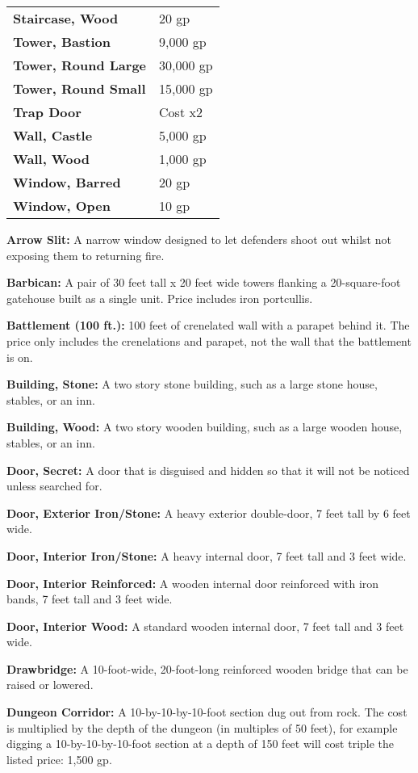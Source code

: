 \begin{multicols*}{2}
\begin {table}[H]
\begin{tabularx}{\columnwidth}{>{\bfseries}YY}
	Staircase, Wood & 20 gp\\
	Tower, Bastion & 9,000 gp\\
	Tower, Round Large & 30,000 gp\\
	Tower, Round Small & 15,000 gp\\
	Trap Door & Cost x2\\
	Wall, Castle & 5,000 gp\\
	Wall, Wood & 1,000 gp\\
	Window, Barred & 20 gp\\
	Window, Open & 10 gp
  \end {tabularx}
\end {table}

\textbf{Arrow Slit:} A narrow window designed to let defenders shoot out whilst not exposing them to returning fire.

\textbf{Barbican:} A pair of 30 feet tall x 20 feet wide towers flanking a 20-square-foot gatehouse built as a single unit. Price includes iron portcullis.

\textbf{Battlement (100 ft.):} 100 feet of crenelated wall with a parapet behind it. The price only includes the crenelations and parapet, not the wall that the battlement is on.

\textbf{Building, Stone:} A two story stone building, such as a large stone house, stables, or an inn.

\textbf{Building, Wood:} A two story wooden building, such as a large wooden house, stables, or an inn.

\textbf{Door, Secret:} A door that is disguised and hidden so that it will not be noticed unless searched for.

\textbf{Door, Exterior Iron/Stone:} A heavy exterior double-door, 7 feet tall by 6 feet wide.

\textbf{Door, Interior Iron/Stone:} A heavy internal door, 7 feet tall and 3 feet wide.

\textbf{Door, Interior Reinforced:} A wooden internal door reinforced with iron bands, 7 feet tall and 3 feet wide.

\textbf{Door, Interior Wood:} A standard wooden internal door, 7 feet tall and 3 feet wide.

\textbf{Drawbridge:} A 10-foot-wide, 20-foot-long reinforced wooden bridge that can be raised or lowered.

\textbf{Dungeon Corridor:} A 10-by-10-by-10-foot section dug out from rock. The cost is multiplied by the depth of the dungeon (in multiples of 50 feet), for example digging a 10-by-10-by-10-foot section at a depth of 150 feet will cost triple the listed price: 1,500 gp.


\end{multicols*}
